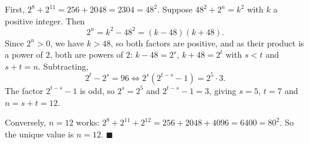 First, $2^8+2^{11}=256+2048=2304=48^2$. Suppose $48^2+2^n=k^2$ with $k$ a positive integer. Then
\[2^n=k^2-48^2=(k-48)(k+48).\]
Since $2^n>0$, we have $k>48$, so both factors are positive, and as their product is a power of $2$, both are powers of $2$: $k-48=2^s$, $k+48=2^t$ with $s<t$ and $s+t=n$. Subtracting,
\[2^t-2^s=96\iff2^s\left(2^{t-s}-1\right)=2^5\cdot3 .\]
The factor $2^{t-s}-1$ is odd, so $2^s=2^5$ and $2^{t-s}-1=3$, giving $s=5$, $t=7$ and $n=s+t=12$.

Conversely, $n=12$ works: $2^8+2^{11}+2^{12}=256+2048+4096=6400=80^2$. So the unique value is $\boxed{n=12}$. $\blacksquare$
